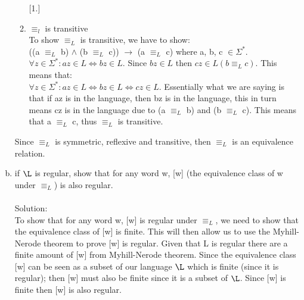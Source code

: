 \documentclass{article}
\newcommand*\moveToRight[1]{\hspace*{0em plus 1fill}\makebox{(#1)}}
\begin{document}
\begin{enumerate}[(a)]
\begin{enumerate} [1.]
        \item $\equiv_l$ is transitive\\
        To show $\equiv_L$ is transitive, we have to show:\\
        ((a $\equiv_L$ b) $\land$ (b $\equiv_L$ c)) $\to$ (a $\equiv_L$ c) where a, b, c $\in \Sigma^*$.\\
        $\forall z \in \Sigma^* : az \in L \Leftrightarrow bz \in L.$ Since $bz \in L $ then $cz \in L (b \equiv_L c)$. This means that:\\ $\forall z \in \Sigma^* : az \in L \Leftrightarrow bz \in L \Leftrightarrow cz \in L$. Essentially what we are saying is that if az is in the language, then bz is in the language, this in turn means cz is in the language due to (a $\equiv_L$ b) and (b $\equiv_L$ c). This means that a $\equiv_L$ c, thus $\equiv_L$ is transitive.
    \end{enumerate}
    Since $\equiv_L$ is symmetric, reflexive and transitive, then $\equiv_L$ is an equivalence relation.
    \item if $\L$ is regular, show that for any word w, [w] (the equivalence class of w under $\equiv_L$) is also regular. \moveToRight{4 marks}\\\\
    Solution:\\
    To show that for any word w, [w] is regular under $\equiv_L$, we need to show that the equivalence class of [w] is finite. This will then allow us to use the Myhill-Nerode theorem to prove [w] is regular. Given that L is regular there are a finite amount of [w] from Myhill-Nerode theorem. Since the equivalence class [w] can be seen as a subset of our language $\L$ which is finite (since it is regular); then [w] must also be finite since it is a subset of $\L$. Since [w] is finite then [w] is also regular.
\end{enumerate}
\end{document}
